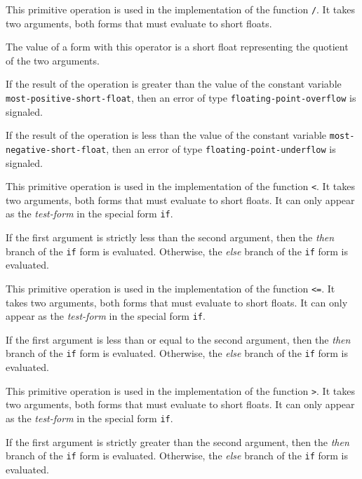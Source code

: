  {}

This primitive operation is used in the implementation of the
\commonlisp{} function \texttt{/}.  It takes two arguments, both forms
that must evaluate to short floats.

The value of a form with this operator is a short float
representing the quotient of the two arguments.

If the result of the operation is greater than the value of the
constant variable \texttt{most-positive-short-float}, then an error of
type \texttt{floating-point-overflow} is signaled.

If the result of the operation is less than the value of the constant
variable \texttt{most-negative-short-float}, then an error of type
\texttt{floating-point-underflow} is signaled.

 {}

This primitive operation is used in the implementation of the
\commonlisp{} function \texttt{<}.  It takes two arguments, both forms
that must evaluate to short floats.  It can only appear as the
\emph{test-form} in the special form \texttt{if}.

If the first argument is strictly less than the second argument, then
the \emph{then} branch of the \texttt{if} form is evaluated.
Otherwise, the \emph{else} branch of the \texttt{if} form is
evaluated.

 {}

This primitive operation is used in the implementation of the
\commonlisp{} function \texttt{<=}.  It takes two arguments, both forms
that must evaluate to short floats.  It can only appear as the
\emph{test-form} in the special form \texttt{if}.

If the first argument is less than or equal to the second argument,
then the \emph{then} branch of the \texttt{if} form is evaluated.
Otherwise, the \emph{else} branch of the \texttt{if} form is
evaluated.

 {}

This primitive operation is used in the implementation of the
\commonlisp{} function \texttt{>}.  It takes two arguments, both forms
that must evaluate to short floats.  It can only appear as the
\emph{test-form} in the special form \texttt{if}.

If the first argument is strictly greater than the second argument,
then the \emph{then} branch of the \texttt{if} form is evaluated.
Otherwise, the \emph{else} branch of the \texttt{if} form is
evaluated.

